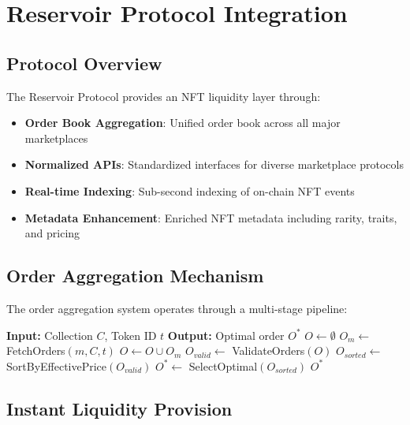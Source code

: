 \section{Reservoir Protocol Integration}


\subsection{Protocol Overview}

The Reservoir Protocol provides an NFT liquidity layer through:

\begin{itemize}
\item \textbf{Order Book Aggregation}: Unified order book across all major marketplaces
\item \textbf{Normalized APIs}: Standardized interfaces for diverse marketplace protocols
\item \textbf{Real-time Indexing}: Sub-second indexing of on-chain NFT events
\item \textbf{Metadata Enhancement}: Enriched NFT metadata including rarity, traits, and pricing
\end{itemize}

\subsection{Order Aggregation Mechanism}

The order aggregation system operates through a multi-stage pipeline:

\begin{algorithm}
\caption{Order Aggregation Pipeline}
\begin{algorithmic}
\STATE \textbf{Input:} Collection $C$, Token ID $t$
\STATE \textbf{Output:} Optimal order $O^*$
\STATE
\STATE $O \leftarrow \emptyset$ 
    \STATE $O_m \leftarrow$ FetchOrders$(m, C, t)$
    \STATE $O \leftarrow O \cup O_m$
\ENDFOR
\STATE
\STATE $O_{valid} \leftarrow$ ValidateOrders$(O)$
\STATE $O_{sorted} \leftarrow$ SortByEffectivePrice$(O_{valid})$
\STATE $O^* \leftarrow$ SelectOptimal$(O_{sorted})$
\RETURN $O^*$
\end{algorithmic}
\end{algorithm}

\subsection{Instant Liquidity Provision}

